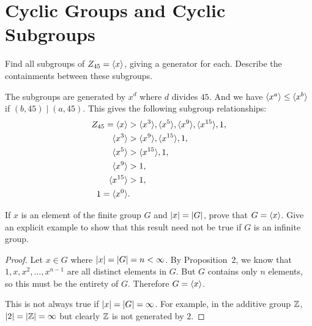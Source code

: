 \section{Cyclic Groups and Cyclic Subgroups}

 Find all subgroups of $Z_{45} = \langle{x}\rangle$, giving a
generator for each. Describe the containments between these subgroups.
\begin{solution}
  The subgroups are generated by $x^d$ where $d$ divides $45$. And we
  have $\langle{x^a}\rangle \leq \langle{x^b}\rangle$ if $(b,45) \mid (a,45)$. This gives
  the following subgroup relationships:
  \begin{align*}
    Z_{45} = \gen{x} &> \gen{x^3}, \gen{x^5},
                       \gen{x^9}, \gen{x^{15}}, 1, \\
    \gen{x^3} &> \gen{x^9}, \gen{x^{15}}, 1, \\
    \gen{x^5} &> \gen{x^{15}}, 1, \\
    \gen{x^9} &> 1, \\
    \gen{x^{15}} &> 1, \\
    1 = \gen{x^0}\rlap. & \qedhere
  \end{align*}
\end{solution}

 If $x$ is an element of the finite group $G$ and
$\lvert{x}\rvert = \lvert{G}\rvert$, prove that $G = \langle{x}\rangle$. Give an explicit
example to show that this result need not be true if $G$ is an
infinite group.
\begin{proof}
  Let $x\in G$ where $\lvert{x}\rvert = \lvert{G}\rvert = n < \infty$. By
  Proposition~2, we know that $1, x, x^2, \dots, x^{n-1}$ are all
  distinct elements in $G$. But $G$ contains only $n$ elements, so
  this must be the entirety of $G$. Therefore $G = \langle{x}\rangle$.

  This is not always true if $\lvert{x}\rvert = \lvert{G}\rvert = \infty$. For
  example, in the additive group $\mathbb{Z}$, $\lvert{2}\rvert = \lvert{\mathbb{Z}}\rvert = \infty$
  but clearly $\mathbb{Z}$ is not generated by $2$.
\end{proof}
